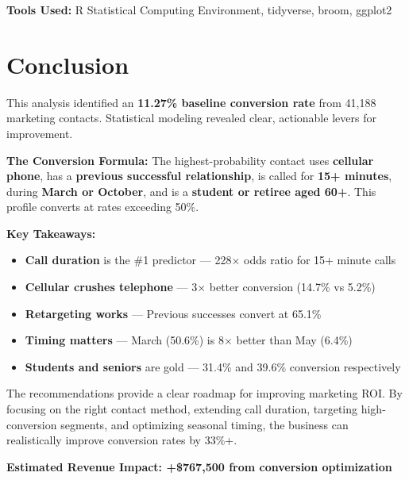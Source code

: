 \documentclass[11pt,a4paper]{article}
\begin{document}
\textbf{Tools Used:} R Statistical Computing Environment, tidyverse, broom, ggplot2

\section{Conclusion}

\begin{tcolorbox}[
    colback=primary!5,
    colframe=primary!50,
    arc=8pt,
    left=15pt,
    right=15pt,
    top=15pt,
    bottom=15pt
]
This analysis identified an \textbf{11.27\% baseline conversion rate} from 41,188 marketing contacts. Statistical modeling revealed clear, actionable levers for improvement.

\vspace{8pt}

\textbf{The Conversion Formula:} The highest-probability contact uses \textbf{cellular phone}, has a \textbf{previous successful relationship}, is called for \textbf{15+ minutes}, during \textbf{March or October}, and is a \textbf{student or retiree aged 60+}. This profile converts at rates exceeding 50\%.

\vspace{8pt}

\textbf{Key Takeaways:}
\begin{itemize}[leftmargin=*]
    \item \textbf{Call duration} is the \#1 predictor — 228$\times$ odds ratio for 15+ minute calls
    \item \textbf{Cellular crushes telephone} — 3$\times$ better conversion (14.7\% vs 5.2\%)
    \item \textbf{Retargeting works} — Previous successes convert at 65.1\%
    \item \textbf{Timing matters} — March (50.6\%) is 8$\times$ better than May (6.4\%)
    \item \textbf{Students and seniors} are gold — 31.4\% and 39.6\% conversion respectively
\end{itemize}

\vspace{8pt}

The recommendations provide a clear roadmap for improving marketing ROI. By focusing on the right contact method, extending call duration, targeting high-conversion segments, and optimizing seasonal timing, the business can realistically improve conversion rates by 33\%+.

\vspace{8pt}

\begin{center}
\textbf{Estimated Revenue Impact: +\$767,500 from conversion optimization}
\end{center}
\end{tcolorbox}
\end{document}
